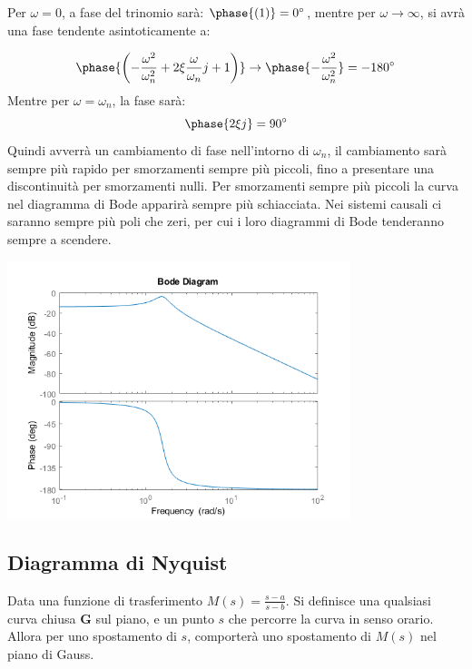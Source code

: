 \documentclass{article}
\numberwithin{equation}{subsection}
\begin{document}
Per $\omega=0$, a fase del trinomio sarà: $\phase{(1)}=0^{\circ}$, mentre per $\omega\to\infty$, si avrà una fase tendente asintoticamente a: 

\begin{equation}
    \phase{\left(-\displaystyle\frac{\omega^2}{\omega_n^2}+2\xi\frac{\omega}{\omega_n}j+1\right)}\to\phase{-\displaystyle\frac{\omega^2}{\omega_n^2}}=-180^{\circ}
\end{equation}
Mentre per $\omega=\omega_n$, la fase sarà: 
\begin{equation}
    \phase{2\xi j}=90^{\circ}
\end{equation}
Quindi avverrà un cambiamento di fase nell'intorno di $\omega_n$, il cambiamento sarà sempre più rapido per smorzamenti sempre più piccoli, fino a presentare una 
discontinuità per smorzamenti nulli. Per smorzamenti sempre più piccoli la curva nel diagramma di Bode apparirà sempre più schiacciata. 
Nei sistemi causali ci saranno sempre più poli che zeri, per cui i loro diagrammi di Bode tenderanno sempre a scendere. \\

\begin{center}
    \includegraphics[width=10cm]{BodeRisonanza}
\end{center}

\subsection{Diagramma di Nyquist}
Data una funzione di trasferimento $M(s)=\displaystyle\frac{s-a}{s-b}$. Si definisce una qualsiasi curva chiusa $\mathbf{G}$ sul piano, e un punto $s$ che percorre la curva in senso 
orario. Allora per uno spostamento di $s$, comporterà uno spostamento di $M(s)$ nel piano di Gauss. 
\end{document}
